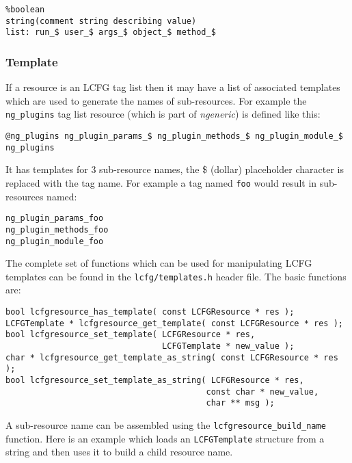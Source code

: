 \documentclass[11pt,a4paper,titlepage]{article}
\begin{document}
\begin{verbatim}
%boolean
string(comment string describing value)
list: run_$ user_$ args_$ object_$ method_$
\end{verbatim}

\subsubsection{Template}
\label{subsec:res_template}

If a resource is an LCFG tag list then it may have a list of
associated templates which are used to generate the names of
sub-resources. For example the \texttt{ng\_plugins} tag list resource
(which is part of \textit{ngeneric}) is defined like this:

\begin{verbatim}
@ng_plugins ng_plugin_params_$ ng_plugin_methods_$ ng_plugin_module_$
ng_plugins
\end{verbatim}

It has templates for 3 sub-resource names, the \$ (dollar) placeholder
character is replaced with the tag name. For example a tag named
\texttt{foo} would result in sub-resources named:

\begin{verbatim}
ng_plugin_params_foo
ng_plugin_methods_foo
ng_plugin_module_foo
\end{verbatim}

The complete set of functions which can be used for manipulating LCFG
templates can be found in the \texttt{lcfg/templates.h} header
file. The basic functions are:

\begin{verbatim}
bool lcfgresource_has_template( const LCFGResource * res );
LCFGTemplate * lcfgresource_get_template( const LCFGResource * res );
bool lcfgresource_set_template( LCFGResource * res,
                                LCFGTemplate * new_value );
char * lcfgresource_get_template_as_string( const LCFGResource * res );
bool lcfgresource_set_template_as_string( LCFGResource * res,
                                         const char * new_value,
                                         char ** msg );
\end{verbatim}

A sub-resource name can be assembled using the
\texttt{lcfgresource\_build\_name} function. Here is an example which
loads an \texttt{LCFGTemplate} structure from a string and then uses
it to build a child resource name.
\end{document}
